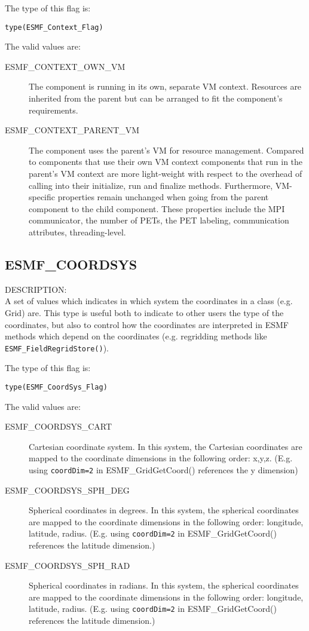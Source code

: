 The type of this flag is:

{\tt type(ESMF\_Context\_Flag)}

The valid values are:
\begin{description}

 \item [ESMF\_CONTEXT\_OWN\_VM]
         The component is running in its own, separate VM context. Resources
         are inherited from the parent but can be arranged to fit the
         component's requirements.
\item [ESMF\_CONTEXT\_PARENT\_VM]
         The component uses the parent's VM for resource management. Compared
         to components that use their own VM context components that run in the
         parent's VM context are more light-weight with respect to the overhead
         of calling into their initialize, run and finalize methods.
         Furthermore, VM-specific properties remain unchanged when going from
         the parent component to the child component. These properties include
         the MPI communicator, the number of PETs, the PET labeling, 
         communication attributes, threading-level.
\end{description}


\subsection{ESMF\_COORDSYS}
\label{const:coordsys}

{\sf DESCRIPTION:\\}
 A set of values which indicates in which system the coordinates in a class (e.g. Grid) are. This type is useful both
to indicate to other users the type of the coordinates, but also to control how the coordinates are interpreted in ESMF
methods which depend on the coordinates (e.g. regridding methods like {\tt ESMF\_FieldRegridStore()}).

The type of this flag is:

{\tt type(ESMF\_CoordSys\_Flag)}

The valid values are:
\begin{description}
\item [ESMF\_COORDSYS\_CART] Cartesian coordinate system. In this system, the Cartesian coordinates are mapped to the coordinate dimensions in the following order: x,y,z. (E.g. using {\tt coordDim=2} in ESMF\_GridGetCoord() references the y dimension) 

\item [ESMF\_COORDSYS\_SPH\_DEG] Spherical coordinates in degrees. In this system, the spherical coordinates are mapped to the coordinate dimensions in the following order: longitude, latitude, radius. (E.g. using {\tt coordDim=2} in ESMF\_GridGetCoord() references the latitude dimension.)

\item [ESMF\_COORDSYS\_SPH\_RAD] Spherical coordinates in radians. In this system, the spherical coordinates are mapped to the coordinate dimensions in the following order: longitude, latitude, radius. (E.g. using {\tt coordDim=2} in ESMF\_GridGetCoord() references the latitude dimension.)

\end{description}

